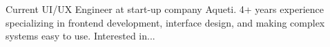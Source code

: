 

\begin{cvparagraph}

Current UI/UX Engineer at start-up company Aqueti. 4+ years experience specializing in frontend development, interface design, and making complex systems easy to use. Interested in...
\end{cvparagraph}
